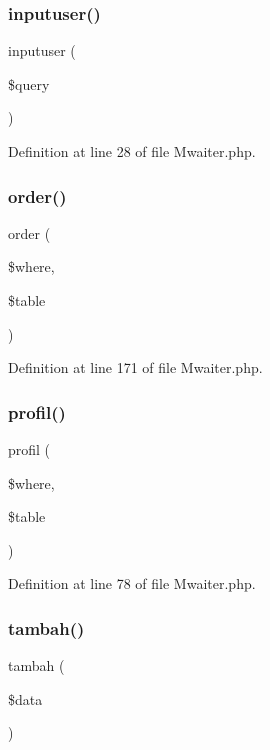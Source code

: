 \subsubsection{\texorpdfstring{inputuser()}{inputuser()}}
{\footnotesize\ttfamily inputuser (\begin{DoxyParamCaption}\item[{}]{\$query }\end{DoxyParamCaption})}



Definition at line 28 of file Mwaiter.\+php.

\mbox{\label{class_mwaiter_a4fbd9d3452149bf51f6f9549a72baa3e}} 
\subsubsection{\texorpdfstring{order()}{order()}}
{\footnotesize\ttfamily order (\begin{DoxyParamCaption}\item[{}]{\$where,  }\item[{}]{\$table }\end{DoxyParamCaption})}



Definition at line 171 of file Mwaiter.\+php.

\mbox{\label{class_mwaiter_a76e16cab9f6d103739adac11e86bce5f}} 
\subsubsection{\texorpdfstring{profil()}{profil()}}
{\footnotesize\ttfamily profil (\begin{DoxyParamCaption}\item[{}]{\$where,  }\item[{}]{\$table }\end{DoxyParamCaption})}



Definition at line 78 of file Mwaiter.\+php.

\mbox{\label{class_mwaiter_a323e89388e0e68d8196e4d5d4be3d2ba}} 
\subsubsection{\texorpdfstring{tambah()}{tambah()}}
{\footnotesize\ttfamily tambah (\begin{DoxyParamCaption}\item[{}]{\$data }\end{DoxyParamCaption})}



